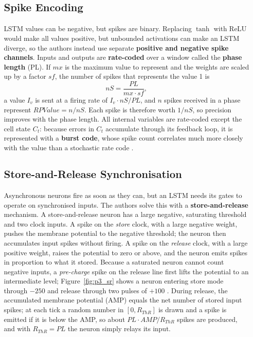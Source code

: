 \documentclass[12pt,a4paper,final]{extreport}
\begin{document}
\subsection{Spike Encoding}

\paragraph{} LSTM values can be negative, but spikes are binary. Replacing $\tanh$ with ReLU would make all values positive, but unbounded activations can make an LSTM diverge, so the authors instead use separate \textbf{positive and negative spike channels}. Inputs and outputs are \textbf{rate-coded} over a window called the \textbf{phase length} (PL). If $mx$ is the maximum value to represent and the weights are scaled up by a factor $sf$, the number of spikes that represents the value 1 is
\begin{equation}
nS=\frac{PL}{mx\cdot sf},
\end{equation}
a value $I_v$ is sent at a firing rate of $I_v\cdot nS/PL$, and $n$ spikes received in a phase represent $\mathit{RPValue}=n/nS$. Each spike is therefore worth $1/nS$, so precision improves with the phase length. All internal variables are rate-coded except the cell state $C_t$: because errors in $C_t$ accumulate through its feedback loop, it is represented with a \textbf{burst code}, whose spike count correlates much more closely with the value than a stochastic rate code \cite{p3}.

\subsection{Store-and-Release Synchronisation}

\paragraph{} Asynchronous neurons fire as soon as they can, but an LSTM needs its gates to operate on synchronised inputs. The authors solve this with a \textbf{store-and-release} mechanism. A store-and-release neuron has a large negative, saturating threshold and two clock inputs. A spike on the \emph{store} clock, with a large negative weight, pushes the membrane potential to the negative threshold; the neuron then accumulates input spikes without firing. A spike on the \emph{release} clock, with a large positive weight, raises the potential to zero or above, and the neuron emits spikes in proportion to what it stored. Because a saturated neuron cannot count negative inputs, a \emph{pre-charge} spike on the release line first lifts the potential to an intermediate level; Figure~\ref{fig:p3_sr} shows a neuron entering store mode through $-250$ and release through two pulses of $+100$ \cite{p3}. During release, the accumulated membrane potential (AMP) equals the net number of stored input spikes; at each tick a random number in $[0,R_{ThR}]$ is drawn and a spike is emitted if it is below the AMP, so about $PL\cdot\mathit{AMP}/R_{ThR}$ spikes are produced, and with $R_{ThR}=PL$ the neuron simply relays its input.
\end{document}

